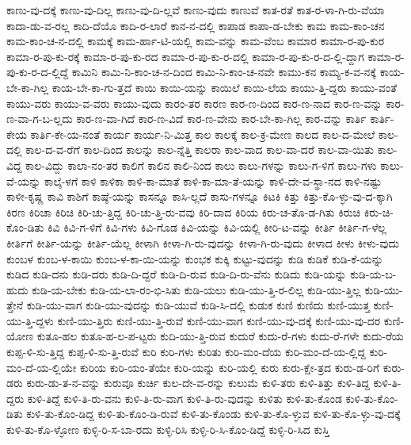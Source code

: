 {ಕಾಣು-ವು-ದಕ್ಕೆ
ಕಾಣು-ವು-ದಿಲ್ಲ
ಕಾಣು-ವು-ದಿ-ಲ್ಲವೆ
ಕಾಣು-ವುದು
ಕಾಣುವೆ
ಕಾತ-ರತೆ
ಕಾತ-ರ-ಳಾ-ಗಿ-ರು-ವೆಯಾ
ಕಾದಾ-ಡು-ವ-ರಲ್ಲ
ಕಾದಿ-ದೆಯೊ
ಕಾದಿ-ರ-ಲಾರೆ
ಕಾನ-ನ-ದಲ್ಲಿ
ಕಾಪಾಡ
ಕಾಪಾ-ಡ-ಬೇಕು
ಕಾಮ
ಕಾಮ-ಕಾಂ-ಚನ
ಕಾಮ-ಕಾಂ-ಚ-ನ-ದಲ್ಲಿ
ಕಾಮಕ್ಕೆ
ಕಾಮ-ರ್ಹಾ-ಟಿ-ಯಲ್ಲಿ
ಕಾಮ-ವನ್ನು
ಕಾಮ-ವೆಂಬ
ಕಾಮಾರ
ಕಾಮಾ-ರ-ಪು-ಕುರ
ಕಾಮಾ-ರ-ಪು-ಕು-ರಕ್ಕೆ
ಕಾಮಾ-ರ-ಪು-ಕು-ರದ
ಕಾಮಾ-ರ-ಪು-ಕು-ರ-ದಲ್ಲಿ
ಕಾಮಾ-ರ-ಪು-ಕು-ರ-ದ-ಲ್ಲಿ-ದ್ದಾಗ
ಕಾಮಾ-ರ-ಪು-ಕು-ರ-ದ-ಲ್ಲಿದ್ದೆ
ಕಾಮಿನಿ
ಕಾಮಿ-ನಿ-ಕಾಂ-ಚ-ನ-ದಿಂದ
ಕಾಮಿ-ನಿ-ಕಾಂ-ಚ-ನವೇ
ಕಾಮು-ಕನ
ಕಾಮ್ಯ-ಕ-ವ-ನಕ್ಕೆ
ಕಾಯ-ಬೇ-ಕಾ-ಗಿಲ್ಲ
ಕಾಯ-ಬೇ-ಕಾ-ಗು-ತ್ತದೆ
ಕಾಯಿ
ಕಾಯಿ-ಯನ್ನು
ಕಾಯಿಲೆ
ಕಾಯಿ-ಲೆಯ
ಕಾಯು-ತ್ತಿ-ದ್ದರು
ಕಾಯು-ವಂತೆ
ಕಾಯು-ವರು
ಕಾಯು-ವ-ವರು
ಕಾಯು-ವುದು
ಕಾರಂ-ತರ
ಕಾರಣ
ಕಾರ-ಣ-ದಿಂದ
ಕಾರ-ಣ-ನಾದ
ಕಾರ-ಣ-ವನ್ನು
ಕಾರ-ಣ-ವಾ-ಗ-ಬ-ಲ್ಲದು
ಕಾರ-ಣ-ವಾ-ಗಿದೆ
ಕಾರ-ಣ-ವಿದೆ
ಕಾರ-ಣ-ವೇನು
ಕಾರ-ಬೇ-ಕಾ-ಗಿಲ್ಲ
ಕಾರ-ವನ್ನು
ಕಾರ್ತಿ
ಕಾರ್ತಿ-ಕೇಯ
ಕಾರ್ತಿ-ಕೇ-ಯ-ನಂತೆ
ಕಾರ್ಯ
ಕಾರ್ಯ-ನಿ-ಮಿತ್ತ
ಕಾಲ
ಕಾಲಕ್ಕೆ
ಕಾಲ-ಕ್ರ-ಮೇಣ
ಕಾಲದ
ಕಾಲ-ದ-ಮೇಲೆ
ಕಾಲ-ದಲ್ಲಿ
ಕಾಲ-ದ-ವ-ರೆಗೆ
ಕಾಲ-ದಿಂದ
ಕಾಲನ್ನು
ಕಾಲ-ನ್ನೆತ್ತಿ
ಕಾಲರಾ
ಕಾಲ-ವಾದ
ಕಾಲ-ವಾ-ದರೆ
ಕಾಲ-ವಾ-ಯಿತು
ಕಾಲ-ವಿದ್ದ
ಕಾಲ-ವಿದ್ದು
ಕಾಲಾ-ನಂ-ತರ
ಕಾಲಿಗೆ
ಕಾಲಿನ
ಕಾಲಿ-ನಿಂದ
ಕಾಲು
ಕಾಲು-ಗಳನ್ನು
ಕಾಲು-ಗ-ಳಿಗೆ
ಕಾಲು-ಗಳು
ಕಾಲು-ವೆ-ಯನ್ನು
ಕಾಲ್ಕೆ-ಳಗೆ
ಕಾಳಿ
ಕಾಳಿಕಾ
ಕಾಳಿ-ಕಾ-ಮಾತೆ
ಕಾಳಿ-ಕಾ-ಮಾ-ತೆ-ಯನ್ನು
ಕಾಳಿ-ದೇ-ವ-ಸ್ಥಾ-ನದ
ಕಾಳಿ-ನಷ್ಟು
ಕಾಳೀ-ಕೃಷ್ಣ
ಕಾವಿ
ಕಾಶಿಗೆ
ಕಾಷ್ಠೆ-ಯನ್ನು
ಕಾಸನ್ನೂ
ಕಾಸಿ-ಲ್ಲದೆ
ಕಾಸು-ಗಳನ್ನೂ
ಕಿಟಕಿ
ಕಿತ್ತು
ಕಿತ್ತು-ಕೊ-ಳ್ಳು-ವು-ದ-ಕ್ಕಾಗಿ
ಕಿರಣ
ಕಿರಿಚಾ
ಕಿರಿಚಿ
ಕಿರಿ-ಚು-ತ್ತಿದ್ದ
ಕಿರಿ-ಚು-ತ್ತಿ-ರು-ವವು
ಕಿರಿ-ದಾದ
ಕಿರಿಯ
ಕಿರು-ಚ-ತೊ-ಡ-ಗಿತು
ಕಿರುಚಿ
ಕಿರು-ಚಿ-ಕೊಂ-ಡಿತು
ಕಿವಿ
ಕಿವಿ-ಗ-ಳಿಗೆ
ಕಿವಿ-ಗಳು
ಕಿವಿ-ಗೊಡ
ಕಿವಿ-ಯನ್ನು
ಕಿವಿ-ಯಲ್ಲಿ
ಕೀರಿ-ಟ-ವನ್ನು
ಕೀರ್ತಿ
ಕೀರ್ತಿ-ಗ-ಳೆಲ್ಲ
ಕೀರ್ತಿಗೆ
ಕೀರ್ತಿ-ಯನ್ನು
ಕೀರ್ತಿ-ಯೆಲ್ಲ
ಕೀಳಾಗಿ
ಕೀಳಾ-ಗಿ-ರು-ವುದನ್ನು
ಕೀಳಾ-ಗಿ-ರು-ವುದು
ಕೀಳಾದ
ಕೀಳು
ಕೀಳು-ವುದು
ಕುಂಬಳ
ಕುಂಬ-ಳ-ಕಾಯಿ
ಕುಂಬ-ಳ-ಕಾ-ಯಿ-ಯನ್ನು
ಕುಂಭಕ
ಕುಕ್ಕಿ
ಕುಟ್ಟು-ವುದನ್ನು
ಕುಡಿ
ಕುಡಿಕೆ
ಕುಡಿ-ಕೆ-ಯನ್ನು
ಕುಡಿದ
ಕುಡಿ-ದನು
ಕುಡಿ-ದರು
ಕುಡಿ-ದಿ-ದ್ದರೆ
ಕುಡಿ-ದಿ-ರುವ
ಕುಡಿ-ದಿ-ರು-ವೆನು
ಕುಡಿದು
ಕುಡಿ-ಯನ್ನು
ಕುಡಿ-ಯ-ಬ-ಹುದು
ಕುಡಿ-ಯ-ಬೇಕು
ಕುಡಿ-ಯ-ಲಾ-ರಂ-ಭಿ-ಸಿತು
ಕುಡಿ-ಯಲು
ಕುಡಿ-ಯು-ತ್ತಿ-ರ-ಲಿಲ್ಲ
ಕುಡಿ-ಯು-ತ್ತಿಲ್ಲ
ಕುಡಿ-ಯು-ತ್ತೇನೆ
ಕುಡಿ-ಯು-ವಾಗ
ಕುಡಿ-ಯು-ವುದನ್ನು
ಕುಡಿ-ಯುವೆ
ಕುಡಿ-ಸಿ-ದಲ್ಲಿ
ಕುಡುಕ
ಕುಣಿ
ಕುಣಿದು
ಕುಣಿ-ಯುತ್ತ
ಕುಣಿ-ಯು-ತ್ತಿ-ದ್ದಳು
ಕುಣಿ-ಯು-ತ್ತಿರು
ಕುಣಿ-ಯು-ತ್ತಿ-ರುವೆ
ಕುಣಿ-ಯು-ವಾಗ
ಕುಣಿ-ಯು-ವು-ದಕ್ಕೆ
ಕುಣಿ-ಯು-ವು-ದರ
ಕುಣಿ-ಯೋಣ
ಕುತೂ-ಹಲ
ಕುತೂ-ಹ-ಲ-ಪ-ಟ್ಟರು
ಕುದಿ-ಯು-ತ್ತಿ-ರುವ
ಕುದುರೆ
ಕುದು-ರೆ-ಗಳು
ಕುದು-ರೆ-ಗಳೇ
ಕುದು-ರೆಯ
ಕುಪ್ಪ-ಳಿ-ಸು-ತ್ತಿದ್ದ
ಕುಪ್ಪ-ಳಿ-ಸು-ತ್ತಿ-ರುವೆ
ಕುರಿ
ಕುರಿ-ಗಳು
ಕುರಿತು
ಕುರಿ-ಮಂ-ದೆಯ
ಕುರಿ-ಮಂ-ದೆ-ಯ-ಲ್ಲಿದ್ದ
ಕುರಿ-ಮಂ-ದೆ-ಯ-ಲ್ಲಿಯೇ
ಕುರಿಯ
ಕುರಿ-ಯಂ-ತೆಯೇ
ಕುರಿ-ಯನ್ನು
ಕುರಿ-ಯಲ್ಲಿ
ಕುರು
ಕುರು-ಕ್ಷೇ-ತ್ರದ
ಕುರು-ಡ-ರಿಗೆ
ಕುರು-ಡರು
ಕುರು-ಡು-ತ-ನ-ವನ್ನು
ಕುರುವೂ
ಕುರ್ಚಿ
ಕುಲ-ದೇ-ವ-ರನ್ನು
ಕುಲುಮೆ
ಕುಳಿ-ತರು
ಕುಳಿ-ತಿತ್ತು
ಕುಳಿ-ತಿದ್ದ
ಕುಳಿ-ತಿ-ದ್ದರು
ಕುಳಿ-ತಿದ್ದೆ
ಕುಳಿ-ತಿ-ರು-ವನು
ಕುಳಿ-ತಿ-ರು-ವಾಗ
ಕುಳಿ-ತಿ-ರು-ವುದನ್ನು
ಕುಳಿತು
ಕುಳಿ-ತು-ಕೊಂಡ
ಕುಳಿ-ತು-ಕೊಂ-ಡಿತು
ಕುಳಿ-ತು-ಕೊಂ-ಡಿದ್ದ
ಕುಳಿ-ತು-ಕೊಂ-ಡಿ-ರುವೆ
ಕುಳಿ-ತು-ಕೊಂಡು
ಕುಳಿ-ತು-ಕೊ-ಳ್ಳುವ
ಕುಳಿ-ತು-ಕೊ-ಳ್ಳು-ವು-ದಕ್ಕೆ
ಕುಳಿ-ತು-ಕೊ-ಳ್ಳೋಣ
ಕುಳ್ಳಿ-ರಿ-ಸ-ಬಾ-ರದು
ಕುಳ್ಳಿ-ರಿಸಿ
ಕುಳ್ಳಿ-ರಿ-ಸಿ-ಕೊಂ-ಡಿದ್ದೆ
ಕುಳ್ಳಿ-ರಿ-ಸಿದ
ಕುಸ್ತಿ
}
